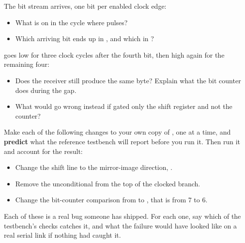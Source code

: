 \begin{parts}
  \item The bit stream  arrives, one bit per enabled clock edge:
    \begin{itemize}
      \item What is on  in the cycle where  pulses?
      \item Which arriving bit ends up in , and which in ?
    \end{itemize}
  \item {} goes low for three clock cycles after the fourth bit, then high again
    for the remaining four:
    \begin{itemize}
      \item Does the receiver still produce the same byte? Explain what the bit counter does during
        the gap.
      \item What would go wrong instead if  gated only the shift register and
        not the counter?
    \end{itemize}
  \item Make each of the following changes to your own copy of , one at a
    time, and \textbf{predict} what the reference testbench will report before you run it. Then run
    it and account for the result:
    \begin{itemize}
      \item Change the shift line to the mirror-image direction,
        .
      \item Remove the unconditional  from the top of the clocked branch.
      \item Change the bit-counter comparison from  to ,
        that is from 7 to 6.
    \end{itemize}
    Each of these is a real bug someone has shipped. For each one, say which of the testbench's
    checks catches it, and what the failure would have looked like on a real serial link if nothing
    had caught it.
\end{parts}
